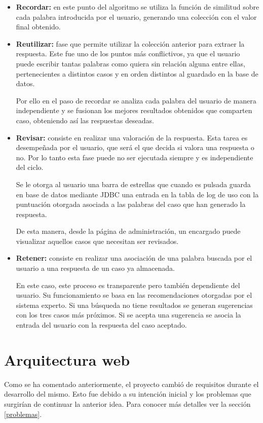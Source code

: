 \begin{itemize}
\tightlist
\item
\textbf{Recordar:} en este punto del algoritmo se utiliza la función de similitud sobre cada palabra introducida por el usuario, generando una colección con el valor final obtenido.
\item
\textbf{Reutilizar:} fase que permite utilizar la colección anterior para extraer la respuesta. Este fue uno de los puntos más conflictivos, ya que el usuario puede escribir tantas palabras como quiera sin relación alguna entre ellas, pertenecientes a distintos casos y en orden distintos al guardado en la base de datos.

Por ello en el paso de recordar se analiza cada palabra del usuario de manera independiente y se fusionan los mejores resultados obtenidos que comparten caso, obteniendo así las respuestas deseadas.
\item
\textbf{Revisar:} consiste en realizar una valoración de la respuesta. Esta tarea es desempeñada por el usuario, que será el que decida si valora una respuesta o no. Por lo tanto esta fase puede no ser ejecutada siempre y es independiente del ciclo.

Se le otorga al usuario una barra de estrellas que cuando es pulsada guarda en base de datos mediante JDBC una entrada en la tabla de log de uso con la puntuación otorgada asociada a las palabras del caso que han generado la respuesta. 

De esta manera, desde la página de administración, un encargado puede visualizar aquellos casos que necesitan ser revisados.
\item
\textbf{Retener:} consiste en realizar una asociación de una palabra buscada por el usuario a una respuesta de un caso ya almacenada.

En este caso, este proceso es transparente pero también dependiente del usuario. Su funcionamiento se basa en las recomendaciones otorgadas por el sistema experto. Si una búsqueda no tiene resultados se generan sugerencias con los tres casos más próximos. Si se acepta una sugerencia se asocia la entrada del usuario con la respuesta del caso aceptado.
\end{itemize}

\section{Arquitectura web}

Como se ha comentado anteriormente, el proyecto cambió de requisitos durante el desarrollo del mismo. Esto fue debido a su intención inicial y los problemas que surgirían de continuar la anterior idea. Para conocer más detalles ver la sección \ref{problemas}.

